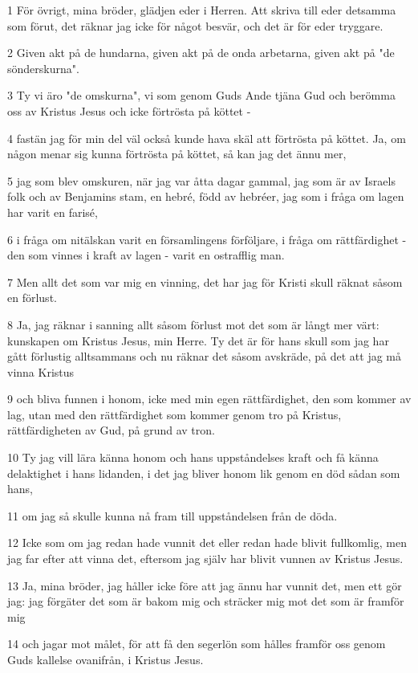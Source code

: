\par 1 För övrigt, mina bröder, glädjen eder i Herren. Att skriva till eder detsamma som förut, det räknar jag icke för något besvär, och det är för eder tryggare.
\par 2 Given akt på de hundarna, given akt på de onda arbetarna, given akt på "de sönderskurna".
\par 3 Ty vi äro "de omskurna", vi som genom Guds Ande tjäna Gud och berömma oss av Kristus Jesus och icke förtrösta på köttet -
\par 4 fastän jag för min del väl också kunde hava skäl att förtrösta på köttet. Ja, om någon menar sig kunna förtrösta på köttet, så kan jag det ännu mer,
\par 5 jag som blev omskuren, när jag var åtta dagar gammal, jag som är av Israels folk och av Benjamins stam, en hebré, född av hebréer, jag som i fråga om lagen har varit en farisé,
\par 6 i fråga om nitälskan varit en församlingens förföljare, i fråga om rättfärdighet - den som vinnes i kraft av lagen - varit en ostrafflig man.
\par 7 Men allt det som var mig en vinning, det har jag för Kristi skull räknat såsom en förlust.
\par 8 Ja, jag räknar i sanning allt såsom förlust mot det som är långt mer värt: kunskapen om Kristus Jesus, min Herre. Ty det är för hans skull som jag har gått förlustig alltsammans och nu räknar det såsom avskräde, på det att jag må vinna Kristus
\par 9 och bliva funnen i honom, icke med min egen rättfärdighet, den som kommer av lag, utan med den rättfärdighet som kommer genom tro på Kristus, rättfärdigheten av Gud, på grund av tron.
\par 10 Ty jag vill lära känna honom och hans uppståndelses kraft och få känna delaktighet i hans lidanden, i det jag bliver honom lik genom en död sådan som hans,
\par 11 om jag så skulle kunna nå fram till uppståndelsen från de döda.
\par 12 Icke som om jag redan hade vunnit det eller redan hade blivit fullkomlig, men jag far efter att vinna det, eftersom jag själv har blivit vunnen av Kristus Jesus.
\par 13 Ja, mina bröder, jag håller icke före att jag ännu har vunnit det, men ett gör jag: jag förgäter det som är bakom mig och sträcker mig mot det som är framför mig
\par 14 och jagar mot målet, för att få den segerlön som hålles framför oss genom Guds kallelse ovanifrån, i Kristus Jesus.
